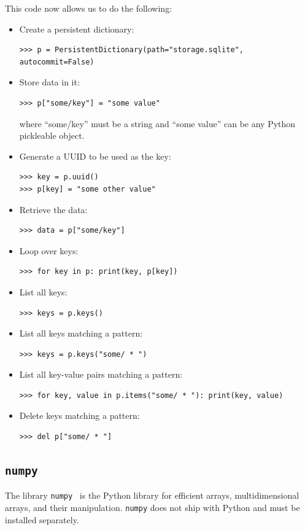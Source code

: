 \documentclass[justified, sixbynine]{tufte-book}
\def\ft{\small\tt}
\theoremstyle{plain}%
\newtheorem * {corollary}{Corollary}
\theoremstyle{definition}
\theoremstyle{remark}
\newtheorem * {remark}{Remark}
\newtheorem * {note}{Note}
\begin{document}
\begin{fullwidth}
This code now allows us to do the following:
\begin{itemize}
\item Create a persistent dictionary:
\begin{lstlisting}
>>> p = PersistentDictionary(path="storage.sqlite", autocommit=False)
\end{lstlisting}
\item Store data in it:
\begin{lstlisting}
>>> p["some/key"] = "some value"
\end{lstlisting}
where ``some/key'' must be a string and ``some value'' can be any Python pickleable object.
\item Generate a UUID to be used as the key:
\begin{lstlisting}
>>> key = p.uuid()
>>> p[key] = "some other value"
\end{lstlisting}
\item Retrieve the data:
\begin{lstlisting}
>>> data = p["some/key"]
\end{lstlisting}
\item Loop over keys:
\begin{lstlisting}
>>> for key in p: print(key, p[key])
\end{lstlisting}
\item List all keys:
\begin{lstlisting}
>>> keys = p.keys()
\end{lstlisting}
\item List all keys matching a pattern:
\begin{lstlisting}
>>> keys = p.keys("some/ * ")
\end{lstlisting}
\item List all key-value pairs matching a pattern:
\begin{lstlisting}
>>> for key, value in p.items("some/ * "): print(key, value)
\end{lstlisting}
\item Delete keys matching a pattern:
\begin{lstlisting}
>>> del p["some/ * "]
\end{lstlisting}
\end{itemize}

\goodbreak\subsection{{\ft numpy}}

The library {\ft numpy}~\cite{numpy} is the Python library for efficient arrays, multidimensional arrays, and their manipulation. {\ft numpy} does not ship with Python and must be installed separately.


\end{fullwidth}
\end{document}
